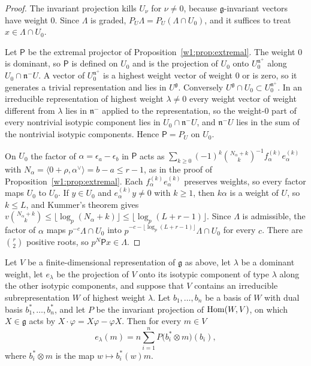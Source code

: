 \begin{proof}
The invariant projection kills $U_\nu$ for $\nu\ne0$, because $\mathfrak g$-invariant vectors have weight $0$. Since $\Lambda$ is graded, $P_U\Lambda=P_U(\Lambda\cap U_0)$, and it suffices to treat $x\in\Lambda\cap U_0$.

Let $\mathsf P$ be the extremal projector of Proposition~\ref{w1:prop:extremal}. The weight $0$ is dominant, so $\mathsf P$ is defined on $U_0$ and is the projection of $U_0$ onto $U_0^{\mathfrak n^+}$ along $U_0\cap\mathfrak n^-U$. A vector of $U_0^{\mathfrak n^+}$ is a highest weight vector of weight $0$ or is zero, so it generates a trivial representation and lies in $U^{\mathfrak g}$. Conversely $U^{\mathfrak g}\cap U_0\subset U_0^{\mathfrak n^+}$. In an irreducible representation of highest weight $\lambda\ne0$ every weight vector of weight different from $\lambda$ lies in $\mathfrak n^-$ applied to the representation, so the weight-$0$ part of every nontrivial isotypic component lies in $U_0\cap\mathfrak n^-U$, and $\mathfrak n^-U$ lies in the sum of the nontrivial isotypic components. Hence $\mathsf P=P_U$ on $U_0$.

On $U_0$ the factor of $\alpha=\epsilon_a-\epsilon_b$ in $\mathsf P$ acts as $\sum_{k\ge0}(-1)^k\binom{N_\alpha+k}k^{-1}f_\alpha^{(k)}e_\alpha^{(k)}$ with $N_\alpha=\langle0+\rho,\alpha^\vee\rangle=b-a\le r-1$, as in the proof of Proposition~\ref{w1:prop:extremal}. Each $f_\alpha^{(k)}e_\alpha^{(k)}$ preserves weights, so every factor maps $U_0$ to $U_0$. If $y\in U_0$ and $e_\alpha^{(k)}y\ne0$ with $k\ge1$, then $k\alpha$ is a weight of $U$, so $k\le L$, and Kummer's theorem gives $v\binom{N_\alpha+k}k\le\lfloor\log_p(N_\alpha+k)\rfloor\le\lfloor\log_p(L+r-1)\rfloor$. Since $\Lambda$ is admissible, the factor of $\alpha$ maps $p^{-c}\Lambda\cap U_0$ into $p^{-c-\lfloor\log_p(L+r-1)\rfloor}\Lambda\cap U_0$ for every $c$. There are $\binom r2$ positive roots, so $p^N\mathsf Px\in\Lambda$.
\end{proof}

\begin{lemma}\label{w1:lem:traceformula}
Let $V$ be a finite-dimensional representation of $\mathfrak g$ as above, let $\lambda$ be a dominant weight, let $e_\lambda$ be the projection of $V$ onto its isotypic component of type $\lambda$ along the other isotypic components, and suppose that $V$ contains an irreducible subrepresentation $W$ of highest weight $\lambda$. Let $b_1,\dots,b_n$ be a basis of $W$ with dual basis $b_1^*,\dots,b_n^*$, and let $P$ be the invariant projection of $\operatorname{Hom}(W,V)$, on which $X\in\mathfrak g$ acts by $X\cdot\varphi=X\varphi-\varphi X$. Then for every $m\in V$
\[
e_\lambda(m)=n\sum_{i=1}^nP\big(b_i^*\otimes m\big)(b_i),
\]
where $b_i^*\otimes m$ is the map $w\mapsto b_i^*(w)m$.
\end{lemma}

